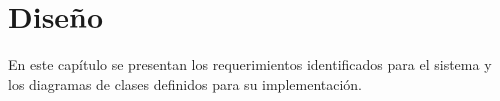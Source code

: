 \chapter{Diseño}
En este capítulo se presentan los requerimientos identificados para el sistema
y los diagramas de clases definidos para su implementación.




